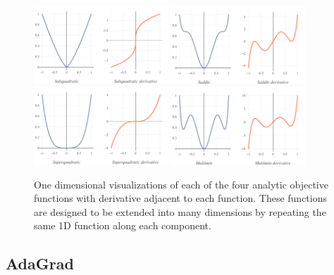 \documentclass[conference]{ieeeconf}  %
\begin{document}
\begin{figure}
  \centering
  \includegraphics[width=0.45\textwidth]{Figures/final-subquadratic}
  \hspace{5mm}
  \includegraphics[width=0.45\textwidth]{Figures/final-saddle}
  \\\vspace{5mm}
  \includegraphics[width=0.45\textwidth]{Figures/final-superquadratic}
  \hspace{5mm}
  \includegraphics[width=0.45\textwidth]{Figures/final-multimin}
  \caption{One dimensional visualizations of each of the four analytic
    objective functions with derivative adjacent to each
    function. These functions are designed to be extended into many
    dimensions by repeating the same 1D function along each
    component.}
  \label{fig:objectives}
\end{figure}


\subsection{AdaGrad}
\end{document}
